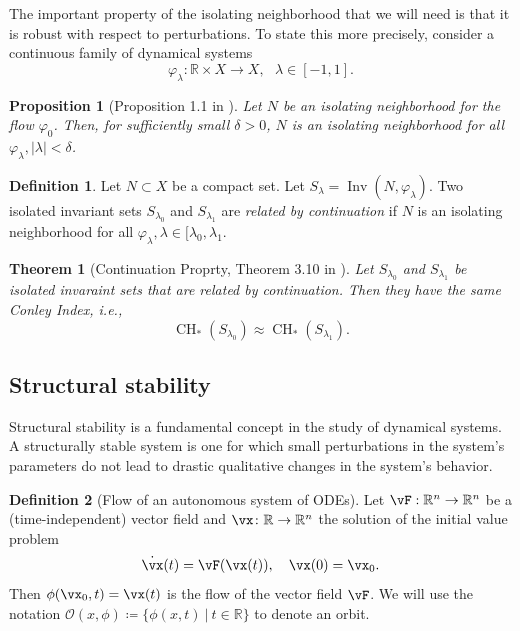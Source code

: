\documentclass{article}
\newtheorem{theorem}{Theorem}
\newtheorem{proposition}{Proposition}
\theoremstyle{definition} \newtheorem{definition}{Definition}
\theoremstyle{remark} \newtheorem{remark}{Remark}
\newcommand{\reals}{\mathbb{R}}
\newcommand{\inv}{\operatorname{Inv}}
\newcounter{ct}
\begin{document}
The important property of the isolating neighborhood that we will need is that it is robust with respect to perturbations. To state this more precisely, consider a continuous family of dynamical systems
\begin{equation}
\varphi_\lambda\colon \reals\times X\rightarrow X, \ \ \ \lambda\in[-1,1].
\end{equation}

\begin{proposition}[Proposition 1.1 in \citep{mischaikow1999cit}]
Let $N$ be an isolating neighborhood for the flow $\varphi_0$. Then, for sufficiently small $\delta>0$, $N$ is an isolating neighborhood for all $\varphi_\lambda, |\lambda|<\delta$.
\end{proposition}

\begin{definition}
Let $N\subset X$ be a compact set. 
Let $S_\lambda = \inv(N,\varphi_\lambda).$
Two isolated invariant sets $S_{\lambda_0}$ and $S_{\lambda_1}$ are \emph{related by continuation} if $N$ is an isolating neighborhood for all $\varphi_\lambda, \lambda\in[\lambda_0,\lambda_1$.
\end{definition}

\begin{theorem}[Continuation Proprty, Theorem 3.10 in \citep{mischaikow1999cit}]
Let $S_{\lambda_0}$ and $S_{\lambda_1}$ be isolated invaraint sets that are related by continuation. 
Then they have the same Conley Index, i.e.,
\[
\operatorname{CH}_*(S_{\lambda_0})\approx \operatorname{CH}_*(S_{\lambda_1}).
\]
\end{theorem}


\subsection{Structural stability}\label{sec:ss}
\citep{peixoto1959ss, mane1987ss, hu1994ss, hayashi1997invariant, robbin1971ss, robinson1974ss, palis1970ss}

Structural stability is a fundamental concept in the study of dynamical systems. A structurally stable system is one for which small perturbations in the system's parameters do not lead to drastic qualitative changes in the system's behavior.

\begin{definition}[Flow of an autonomous system of ODEs]
Let $\vF: \reals^n\rightarrow \reals^n$ be a (time-independent) vector field and $\vx\colon\reals\rightarrow\reals^n$  the solution of the initial value problem
\[
\dot\vx(t) =  \vF(\vx(t)), \ \ \ \vx(0) = \vx_0.
\]
Then $ \phi (\vx_{0},t)=\vx(t)$ is the flow of the vector field $\vF$.
We will use the notation $\mathcal {O}(x,\phi)\coloneqq \{\phi(x,t)\ |\ t\in\reals\}$ to denote an orbit.
\end{definition}
\end{document}
